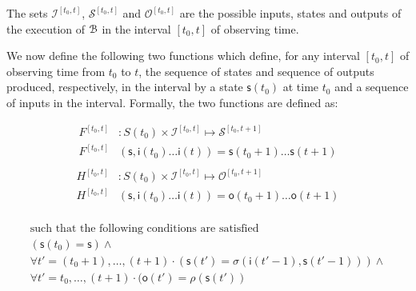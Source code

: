 The sets $\mathcal{I}^{[t_0,t]}$, $\mathcal{S}^{[t_0,t]}$ and $\mathcal{O}^{[t_0,t]}$ are the possible inputs, states and outputs of the execution of ${\mathcal{B}}$ in the interval $[t_0,t]$ of observing time. 

		We now define the following two functions which define,  for any interval $[t_0,t]$ of observing time from $t_0$ to $t$,  the sequence of states and sequence of outputs produced, respectively,  in the interval by a state $\mathsf{s}(t_0)$ at time $t_0$ and a sequence of inputs in the interval. Formally, the two functions are defined as:


\begin{equation}
\begin{split}
F^{[t_0,t]}&: S(t_0)\times \mathcal{I}^{[t_0,t]} \mapsto \mathcal{S}^{[t_0,t+1]}\\
F^{[t_0,t]}&(\mathsf{s}, \mathsf{i}(t_0)\ldots \mathsf{i}(t))= \mathsf{s}(t_0+1)\ldots \mathsf{s}(t+1)\\
 \end{split}
\end{equation}
 \begin{equation}
\begin{split}
 H^{[t_0,t]}&: S(t_0)\times \mathcal{I}^{[t_0,t]} \mapsto \mathcal{O}^{[t_0,t+1]}\\
H^{[t_0,t]}&(\mathsf{s}, \mathsf{i}(t_0)\ldots \mathsf{i}(t))= \mathsf{o}(t_0+1)\ldots \mathsf{o}(t+1)\\
\end{split}
\end{equation}

\[
\begin{array}{llllll}
\mbox{such that the following conditions are satisfied}\\
 (\mathsf{s}(t_0)=\mathsf{s})\wedge \\
 \forall t'=(t_0+1),\ldots,(t+1)\cdot (\mathsf{s}(t')=\sigma(\mathsf{i}(t'-1),\mathsf{s}(t'-1)))\wedge \\
 \forall t'=t_0,\ldots,(t+1)\cdot (\mathsf{o}(t')=\rho(\mathsf{s}(t'))
\end{array}
\]

